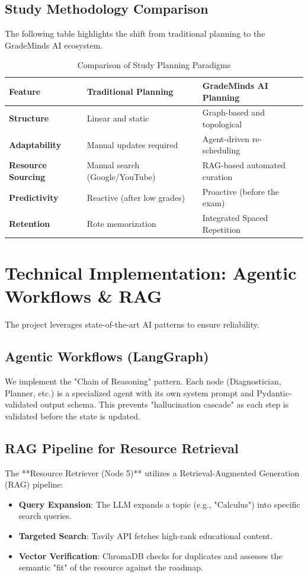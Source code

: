 \documentclass[12pt,a4paper]{article}
\begin{document}
\subsection{Study Methodology Comparison}
The following table highlights the shift from traditional planning to the GradeMinds AI ecosystem.

\begin{table}[H]
    \centering
    \caption{Comparison of Study Planning Paradigms}
    \begin{tabular}{|l|p{5cm}|p{5cm}|}
    \hline
    \textbf{Feature} & \textbf{Traditional Planning} & \textbf{GradeMinds AI Planning} \\ \hline
    \textbf{Structure} & Linear and static & Graph-based and topological \\ \hline
    \textbf{Adaptability} & Manual updates required & Agent-driven re-scheduling \\ \hline
    \textbf{Resource Sourcing} & Manual search (Google/YouTube) & RAG-based automated curation \\ \hline
    \textbf{Predictivity} & Reactive (after low grades) & Proactive (before the exam) \\ \hline
    \textbf{Retention} & Rote memorization & Integrated Spaced Repetition \\ \hline
    \end{tabular}
\end{table}

\section{Technical Implementation: Agentic Workflows \& RAG}
The project leverages state-of-the-art AI patterns to ensure reliability.

\subsection{Agentic Workflows (LangGraph)}
We implement the "Chain of Reasoning" pattern. Each node (Diagnostician, Planner, etc.) is a specialized agent with its own system prompt and Pydantic-validated output schema. This prevents "hallucination cascade" as each step is validated before the state is updated.

\subsection{RAG Pipeline for Resource Retrieval}
The **Resource Retriever (Node 5)** utilizes a Retrieval-Augmented Generation (RAG) pipeline:
\begin{itemize}
    \item \textbf{Query Expansion}: The LLM expands a topic (e.g., "Calculus") into specific search queries.
    \item \textbf{Targeted Search}: Tavily API fetches high-rank educational content.
    \item \textbf{Vector Verification}: ChromaDB checks for duplicates and assesses the semantic "fit" of the resource against the roadmap.
\end{itemize}
\end{document}

